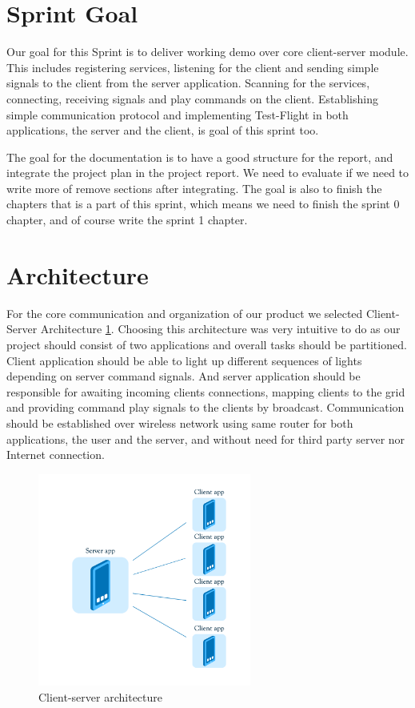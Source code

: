 
\section{Sprint Goal}

Our goal for this Sprint is to deliver working demo over core client-server module.
This includes registering services, listening for the client and sending simple signals to the client from the server application.
Scanning for the services, connecting, receiving signals and play commands on the client.
Establishing simple communication protocol and implementing Test-Flight in both applications, the server and the client, is goal of this sprint too.

The goal for the documentation is to have a good structure for the report, and integrate the project plan in the project report. We need to evaluate if we need to write more of remove sections after integrating. The goal is also to finish the chapters that is a part of this sprint, which means we need to finish the sprint 0 chapter, and of course write the sprint 1 chapter.

\section{Architecture}

For the core communication and organization of our product we selected Client-Server Architecture \ref{fig:sprint1_arhitecture}.
Choosing this architecture was very intuitive to do as our project should consist of two applications and overall tasks should be partitioned. 
Client application should be able to light up different sequences of lights depending on server command signals.
And server application should be responsible for awaiting incoming clients connections, mapping clients to the grid and providing command play signals to the clients by broadcast.
Communication should be established over wireless network using same router for both applications, the user and the server, and without need for third party server nor Internet connection. 

\begin{figure}[H]
	\centering
		\includegraphics[width=7cm]{sprint1/arhitecture.png}
	\caption{Client-server architecture}
	\label{fig:sprint1_arhitecture}
\end{figure}

